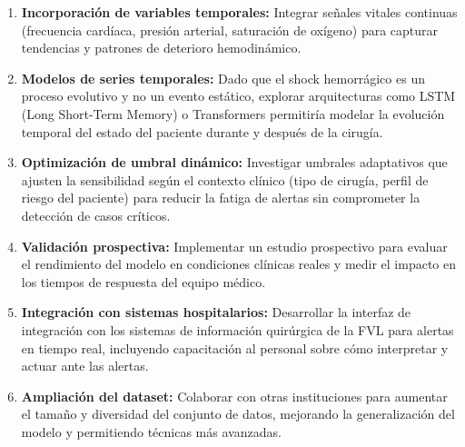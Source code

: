 \begin{enumerate}
    \item \textbf{Incorporación de variables temporales:} Integrar señales vitales continuas (frecuencia cardíaca, presión arterial, saturación de oxígeno) para capturar tendencias y patrones de deterioro hemodinámico.

    \item \textbf{Modelos de series temporales:} Dado que el shock hemorrágico es un proceso evolutivo y no un evento estático, explorar arquitecturas como LSTM (Long Short-Term Memory) o Transformers permitiría modelar la evolución temporal del estado del paciente durante y después de la cirugía.

    \item \textbf{Optimización de umbral dinámico:} Investigar umbrales adaptativos que ajusten la sensibilidad según el contexto clínico (tipo de cirugía, perfil de riesgo del paciente) para reducir la fatiga de alertas sin comprometer la detección de casos críticos.

    \item \textbf{Validación prospectiva:} Implementar un estudio prospectivo para evaluar el rendimiento del modelo en condiciones clínicas reales y medir el impacto en los tiempos de respuesta del equipo médico.

    \item \textbf{Integración con sistemas hospitalarios:} Desarrollar la interfaz de integración con los sistemas de información quirúrgica de la FVL para alertas en tiempo real, incluyendo capacitación al personal sobre cómo interpretar y actuar ante las alertas.

    \item \textbf{Ampliación del dataset:} Colaborar con otras instituciones para aumentar el tamaño y diversidad del conjunto de datos, mejorando la generalización del modelo y permitiendo técnicas más avanzadas.
\end{enumerate}

\newpage

